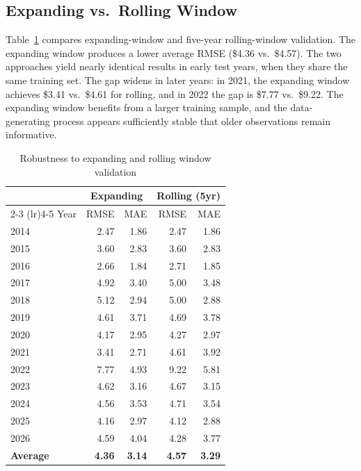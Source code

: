 \documentclass[12pt]{article}
\begin{document}
\subsection{Expanding vs.\ Rolling Window}
\label{subsec:window}

Table~\ref{tab:window} compares expanding-window and five-year rolling-window validation. The expanding window produces a lower average RMSE (\$4.36 vs.\ \$4.57). The two approaches yield nearly identical results in early test years, when they share the same training set. The gap widens in later years: in 2021, the expanding window achieves \$3.41 vs.\ \$4.61 for rolling, and in 2022 the gap is \$7.77 vs.\ \$9.22. The expanding window benefits from a larger training sample, and the data-generating process appears sufficiently stable that older observations remain informative.

\begin{table}[!htbp]
\centering
\caption{Robustness to expanding and rolling window validation}
\label{tab:window}
\begin{tabular}{lrrrr}
\toprule
 & \multicolumn{2}{c}{Expanding} & \multicolumn{2}{c}{Rolling (5yr)} \\
\cmidrule(lr){2-3} \cmidrule(lr){4-5}
Year & RMSE & MAE & RMSE & MAE \\
\midrule
2014 & 2.47 & 1.86 & 2.47 & 1.86 \\
2015 & 3.60 & 2.83 & 3.60 & 2.83 \\
2016 & 2.66 & 1.84 & 2.71 & 1.85 \\
2017 & 4.92 & 3.40 & 5.00 & 3.48 \\
2018 & 5.12 & 2.94 & 5.00 & 2.88 \\
2019 & 4.61 & 3.71 & 4.69 & 3.78 \\
2020 & 4.17 & 2.95 & 4.27 & 2.97 \\
2021 & 3.41 & 2.71 & 4.61 & 3.92 \\
2022 & 7.77 & 4.93 & 9.22 & 5.81 \\
2023 & 4.62 & 3.16 & 4.67 & 3.15 \\
2024 & 4.56 & 3.53 & 4.71 & 3.54 \\
2025 & 4.16 & 2.97 & 4.12 & 2.88 \\
2026 & 4.59 & 4.04 & 4.28 & 3.77 \\
\midrule
\textbf{Average} & \textbf{4.36} & \textbf{3.14} & \textbf{4.57} & \textbf{3.29} \\
\bottomrule
\end{tabular}
\end{table}
\end{document}
